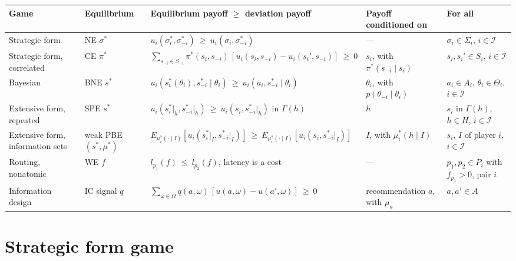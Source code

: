 \documentclass{article}
\begin{document}
\begin{center}
\footnotesize
\setlength{\tabcolsep}{4pt}
\renewcommand{\arraystretch}{1.4}
\begin{tabular}{@{}>{\raggedright\arraybackslash}p{25mm}>{\raggedright\arraybackslash}p{19mm}>{\raggedright\arraybackslash}p{76mm}>{\raggedright\arraybackslash}p{27mm}>{\raggedright\arraybackslash}p{27mm}@{}}
\toprule
Game & Equilibrium & Equilibrium payoff $\ge$ deviation payoff & Payoff conditioned on & For all \\
\midrule
Strategic form & NE $\sigma^*$ &
$u_i(\sigma_i^*,\sigma_{-i}^*)\ \ge\ u_i(\sigma_i,\sigma_{-i}^*)$ &
--- &
$\sigma_i\in\Sigma_i$, $i\in\mathcal I$ \\
Strategic form, correlated & CE $\pi^*$ &
$\sum_{s_{-i}\in S_{-i}}\pi^*(s_i,s_{-i})\,[u_i(s_i,s_{-i})-u_i(s_i',s_{-i})]\ \ge\ 0$ &
$s_i$, with $\pi^*(s_{-i}\mid s_i)$ &
$s_i,s_i'\in S_i$, $i\in\mathcal I$ \\
Bayesian & BNE $s^*$ &
$u_i(s_i^*(\theta_i),s_{-i}^*\mid\theta_i)\ \ge\ u_i(a_i,s_{-i}^*\mid\theta_i)$ &
$\theta_i$, with $p(\theta_{-i}\mid\theta_i)$ &
$a_i\in A_i$, $\theta_i\in\Theta_i$, $i\in\mathcal I$ \\
Extensive form, repeated & SPE $s^*$ &
$u_i(s_i^*\vert_h,s_{-i}^*\vert_h)\ \ge\ u_i(s_i,s_{-i}^*\vert_h)$ in $\Gamma(h)$ &
$h$ &
$s_i$ in $\Gamma(h)$, $h\in H$, $i\in\mathcal I$ \\
Extensive form, information sets & weak PBE $(s^*,\mu^*)$ &
$E_{\mu_i^*(\cdot\mid I)}[u_i(s_i^*\vert_I,s_{-i}^*\vert_I)]\ \ge\ E_{\mu_i^*(\cdot\mid I)}[u_i(s_i,s_{-i}^*\vert_I)]$ &
$I$, with $\mu_i^*(h\mid I)$ &
$s_i$, $I$ of player $i$, $i\in\mathcal I$ \\
Routing, nonatomic & WE $f$ &
$l_{p_1}(f)\ \le\ l_{p_2}(f)$, latency is a cost &
--- &
$p_1,p_2\in P_i$ with $f_{p_1}>0$, pair $i$ \\
Information design & IC signal $q$ &
$\sum_{\omega\in\Omega}q(a,\omega)\,[u(a,\omega)-u(a',\omega)]\ \ge\ 0$ &
recommendation $a$, with $\mu_a$ &
$a,a'\in A$ \\
\bottomrule
\end{tabular}
\end{center}

\section{Strategic form game}
\end{document}

